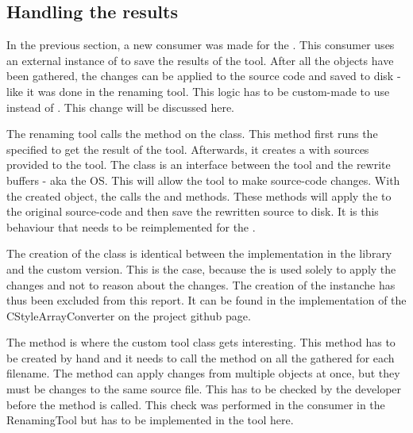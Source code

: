 \subsection{Handling the results}

In the previous section, a new consumer was made for the . This consumer uses an external instance of  to save the results of the tool. After all the  objects have been gathered, the changes can be applied to the source code and saved to disk - like it was done in the renaming tool. This logic has to be custom-made to use  instead of . This change will be discussed here.

The renaming tool calls the  method on the  class. This method first runs the specified  to get the result of the tool. Afterwards, it creates a  with sources provided to the tool. The  class is an interface between the tool and the rewrite buffers - aka the OS. This  will allow the tool to make source-code changes. With the created  object, the  calls the  and  methods. These methods will apply the  to the original source-code and then save the rewritten source to disk. It is this behaviour that needs to be reimplemented for the .

The creation of the  class is identical between the implementation in the library and the custom version. This is the case, because the  is used solely to apply the changes and not to reason about the changes. The creation of the  instanche has thus been excluded from this report. It can be found in the implementation of the CStyleArrayConverter on the project github page. 

The  method is where the custom tool class gets interesting. This method has to be created by hand and it needs to call the  method on all the gathered  for each filename. The  method can apply changes from multiple  objects at once, but they must be changes to the same source file. This has to be checked by the developer before the method is called. This check was performed in the consumer in the RenamingTool but has to be implemented in the tool here. 

